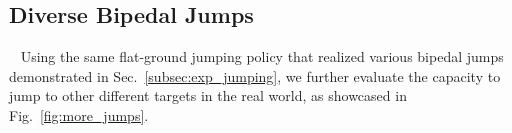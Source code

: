 \subsection{Diverse Bipedal Jumps}~\label{appendix:other_jumps}
Using the same flat-ground jumping policy that realized various bipedal jumps demonstrated in Sec.~\ref{subsec:exp_jumping}, we further evaluate the capacity to jump to other different targets in the real world, as showcased in Fig.~\ref{fig:more_jumps}.


